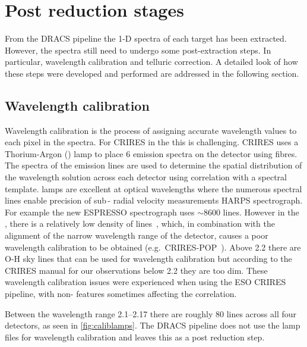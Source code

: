 
\section{Post reduction stages}
\label{sec:posreduction}
From the {DRACS} pipeline the 1-D spectra of each target has been extracted.
However, the spectra still need to undergo some post-extraction steps.
In particular, wavelength calibration and telluric correction.
A detailed look of how these steps were developed and performed are addressed in the following section.

\subsection{Wavelength calibration}
\label{subsec:wavecalib}
Wavelength calibration is the process of assigning accurate wavelength values to each pixel in the spectra.
For {CRIRES} in the \nir{} this is challenging.
{CRIRES} uses a Thorium-Argon (\thar) lamp to place 6 emission spectra on the detector using fibres.
The spectra of the \thar{} emission lines are used to determine the spatial distribution of the wavelength solution across each detector using correlation with a spectral template.
\thar{} lamps are excellent at optical wavelengths where the numerous spectral lines enable precision of sub\,-\mps{} radial velocity measurements {HARPS} spectrograph.
For example the new ESPRESSO spectrograph uses \(\sim8600\) \thar{} lines.
However in the \nir{}, there is a relatively low density of \thar{} lines~\citep{kerber_laboratory_2009}, which, in combination with the alignment of the narrow wavelength range of the detector, causes a poor wavelength calibration to be obtained (e.g.\ {CRIRES}-POP~\citep{nicholls_crirespop_2017}).
Above 2.2\um{} there are {O-H} sky lines that can be used for wavelength calibration but according to the CRIRES manual for our observations below 2.2\um{} they are too dim.
These wavelength calibration issues were experienced when using the {ESO} {CRIRES} pipeline, with non-\thar{} features sometimes affecting the correlation.

Between the wavelength range 2.1--2.17\um{} there are roughly 80 \thar{} lines across all four detectors, as seen in \cref{fig:caliblamps}.
The {DRACS} pipeline does not use the \thar{} lamp files for wavelength calibration and leaves this as a post reduction step.

